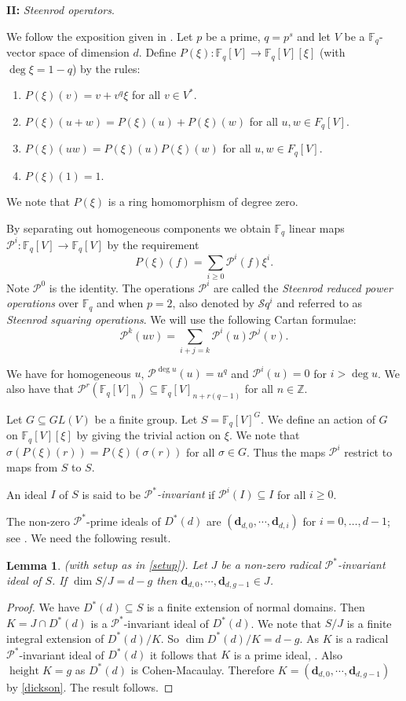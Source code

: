 \documentclass{amsart}
\newcommand{\CM}{Cohen-Macaulay}
\newcommand{\F}{\mathbb{F} }
\newcommand{\db}{\mathbf{d} }
\newcommand{\Z}{\mathbb{Z} }
\newcommand{\Pc}{\mathcal{P} }
\newcommand{\Sq}{\mathcal{S}{q}}
\newcommand{\rt}{\rightarrow}
\newcommand{\height}{\operatorname{height}}
\theoremstyle{plain}
\newtheorem{lemma}[theorem]{Lemma}
\theoremstyle{definition}
\theoremstyle{remark}
\begin{document}
\textbf{II:} \emph{Steenrod operators}.

We follow the exposition given in \cite{SL}.
\s Let $p$ be a prime, $q = p^s$ and let $V$ be a $\F_q$-vector space of dimension $d$.
Define $P(\xi)\colon \F_q[V] \rt \F_q[V][\xi]$ (with $\deg \xi = 1-q$) by the rules:
\begin{enumerate}
  \item $P(\xi)(v)  = v + v^q\xi$  for all $v \in  V^*$.
  \item $P(\xi)(u + w) = P(\xi)(u) + P(\xi)(w)$ for all $u,w \in F_q[V]$.
  \item $P(\xi)(uw) = P(\xi)(u)P(\xi)(w)$ for all $u,w \in F_q[V]$.
  \item $P(\xi)(1) = 1$.
   \end{enumerate}
  We note that $P(\xi)$ is a ring homomorphism of degree zero.

By separating out homogeneous components we obtain $\F_q$ linear maps \\ $\Pc^i \colon \F_q[V] \rt \F_q[V]$ by the requirement
$$P(\xi)(f) = \sum_{i \geq 0}\Pc^i(f)\xi^i.$$
Note $\Pc^0$ is the identity.
The operations $\Pc^i$ are called the \emph{Steenrod reduced power operations} over $\F_q$ and when $p = 2$, also denoted by $\Sq^i$ and referred to as \emph{Steenrod squaring operations}.
We will use the following Cartan formulae:
$$\Pc^k(uv) = \sum_{i+j = k}\Pc^i(u)\Pc^j(v). $$

We  have for homogeneous $u$, $\Pc^{\deg u}(u) = u^q$ and $\Pc^{i}(u) =  0$ for $i > \deg u$.
We also have that $\Pc^r(\F_q[V]_n) \subseteq \F_q[V]_{n + r(q-1)}$ for all $n \in \Z$.

\s Let $G \subseteq GL(V)$ be a finite group. Let $S = \F_q[V]^G$. We define an action of $G$ on $\F_q[V][\xi]$ by giving the trivial action on $\xi$. We note that $\sigma(P(\xi)(r)) = P(\xi)(\sigma(r))$ for all $\sigma \in G$. Thus the maps $\Pc^i$ restrict to maps from $S$ to $S$.

\s An ideal $I$ of $S$ is said to be \emph{$\Pc^*$-invariant} if $\Pc^i(I)\subseteq I$ for all $i \geq 0$.

\s \label{dickson} The non-zero $\Pc^*$-prime ideals of $D^*(d)$ are $(\db_{d,0}, \cdots, \db_{d,i})$ for $i = 0, \ldots, d -1$; see \cite[11.4.6]{SL}.
We need the following result.
\begin{lemma}\label{bella}
(with setup as in \ref{setup}). Let $J$ be a non-zero  radical $\Pc^*$-invariant ideal of $S$. If $\dim S/J = d - g$ then $\db_{d,0}, \cdots, \db_{d, g -1} \in J$.
\end{lemma}
\begin{proof}
  We have $D^*(d) \subseteq S$ is a finite extension of normal domains. Then $K =  J\cap D^*(d)$ is a $\Pc^*$-invariant ideal of $D^*(d)$. We note that $S/J$ is a finite integral extension of $D^*(d)/K$. So $\dim D^*(d)/K = d - g$. As $K$ is a radical $\Pc^*$-invariant ideal of $D^*(d)$ it follows that $K$ is a prime ideal, \cite[11.4.7]{SL}. Also $\height K = g$ as $D^*(d)$ is \CM. Therefore $K = (\db_{d,0}, \cdots, \db_{d, g -1})$ by \ref{dickson}. The result follows.
\end{proof}
\end{document}
